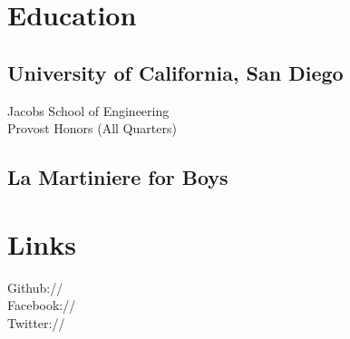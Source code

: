 \documentclass[]{deedy-resume-openfont}
\begin{document}
%
%



%
%

\begin{minipage}[t]{0.31\textwidth} 


\section{Education} 

\subsection{University of California, San Diego}

Jacobs School of Engineering \\
Provost Honors (All Quarters) \\
\sectionsep

\subsection{La Martiniere for Boys}
\sectionsep


\section{Links} 
Github:// \href{https://github.com/Keshav919}{} \\
Facebook:// \href{https://facebook.com/keshav.rungta.3}{}\\
Twitter://  \href{https://twitter.com/keshrunedscmu}{} \\
\sectionsep

\end{minipage}
\end{document}
